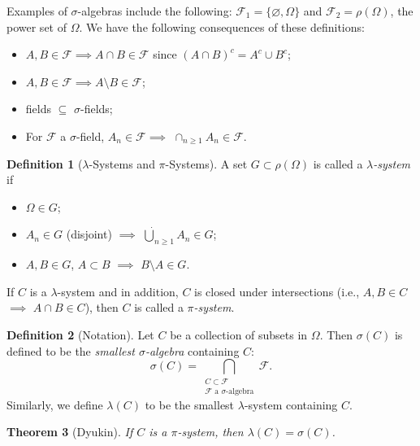 \documentclass[12pt,reqno]{article}
\renewcommand{\emph}[1]{\textit{#1}}
\theoremstyle{plain}
\newtheorem{theorem}{Theorem}[section]
\theoremstyle{definition}
\newtheorem{definition}[theorem]{Definition}
\begin{document}
Examples of $\sigma$-algebras include the following: 
$\mathcal{F}_1 = \{\varnothing, \Omega\}$ and 
$\mathcal{F}_2 = \rho(\Omega)$, the power set of $\Omega$. 
We have the following consequences of these definitions:
\begin{itemize} 

\item $A,B \in \mathcal{F} \implies A \cap B \in \mathcal{F}$ since 
      $(A \cap B)^c = A^c \cup B^c$; 
\item $A,B \in \mathcal{F} \implies A \setminus B \in \mathcal{F}$; 
\item fields $\subseteq$ $\sigma$-fields; 
\item For $\mathcal{F}$ a $\sigma$-field, $A_n \in \mathcal{F} \implies$ 
      $\cap_{n \geq 1} A_n \in \mathcal{F}$. 

\end{itemize} 

\begin{definition}[$\lambda$-Systems and $\pi$-Systems]
A set $G \subset \rho(\Omega)$ is called a \emph{$\lambda$-system} if 
\begin{itemize} 

\item[(1)] $\Omega \in G$; 
\item[(2)] $A_n \in G$ (disjoint) $\implies$ 
     $\dot{\bigcup}_{n \geq 1} A_n \in G$; 
\item[(3)] $A,B \in G$, $A \subset B$ $\implies$ $B \setminus A \in G$. 

\end{itemize} 
If $C$ is a $\lambda$-system and in addition, 
$C$ is closed under intersections 
(i.e., $A,B \in C$ $\implies$ $A \cap B \in C$), then $C$ is called a 
\emph{$\pi$-system}. 
\end{definition} 

\begin{definition}[Notation]
Let $C$ be a collection of subsets in $\Omega$. Then $\sigma(C)$ is defined 
to be the \emph{smallest $\sigma$-algebra} containing $C$: 
\[
\sigma(C) = \bigcap_{\substack{C \subset \mathcal{F} \\ 
     \mathcal{F} \text{ a\ $\sigma$-algebra}}} \mathcal{F}. 
\]
Similarly, we define $\lambda(C)$ to be the smallest $\lambda$-system 
containing $C$. 
\end{definition} 

\begin{theorem}[Dyukin]
If $C$ is a $\pi$-system, then $\lambda(C) = \sigma(C)$. 
\end{theorem} 
\end{document}
